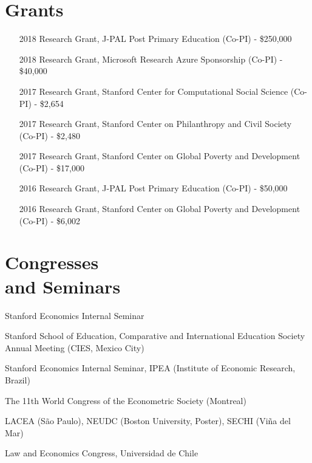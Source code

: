 \documentclass[margin,line]{res}
\begin{document}
\begin{resume}
\section{\sc Grants}
\begin{itemize}[style=multiline,leftmargin=1.2cm,font=\normalfont]
\item[2018] Research Grant, J-PAL Post Primary Education (Co-PI) - \$250,000
\item[2018] Research Grant, Microsoft Research Azure Sponsorship  (Co-PI) -  \$40,000
\item[2017] Research Grant, Stanford Center for Computational Social Science (Co-PI) -  \$2,654
\item[2017] Research Grant, Stanford Center on Philanthropy and Civil Society (Co-PI)  - \$2,480
\item[2017] Research Grant, Stanford Center on Global Poverty and Development (Co-PI) - \$17,000
\item[2016] Research Grant, J-PAL Post Primary Education (Co-PI) - \$50,000
\item[2016] Research Grant, Stanford Center on Global Poverty and Development (Co-PI) - \$6,002
\end{itemize}


\section{\sc Congresses \\ and Seminars}

\begin{description}[style=multiline,leftmargin=1.2cm,font=\normalfont]
\item [2019] Stanford Economics Internal Seminar
\item [2018] Stanford School of Education, Comparative and International Education Society Annual Meeting (CIES, Mexico City)
\item [2017] Stanford Economics Internal Seminar, IPEA (Institute of Economic Research, Brazil)
\item [2015] The 11th World Congress of the Econometric Society (Montreal)
\item [2014] LACEA (S\~ao Paulo), NEUDC (Boston University, Poster), SECHI (Vi\~na del Mar)
\item[2010] Law and Economics Congress, Universidad de Chile 
\end{description}


\end{resume}
\end{document}
